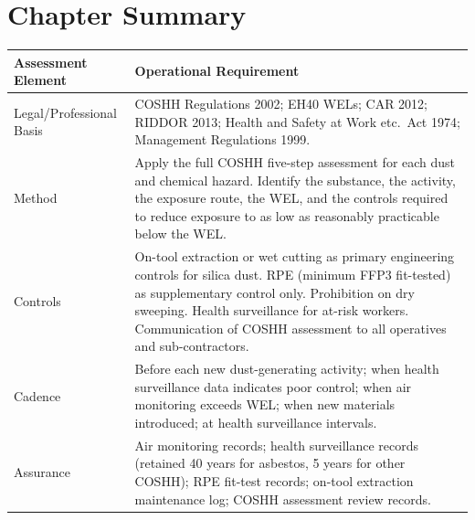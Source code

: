 
\newpage
\section{Chapter Summary}

\begin{table}[H]
\centering
\begin{tabularx}{\textwidth}{>{\raggedright\arraybackslash}p{3.2cm}X}
\toprule
\textbf{Assessment Element} & \textbf{Operational Requirement} \\
\midrule
Legal/Professional Basis & COSHH Regulations 2002; EH40 WELs; CAR 2012; RIDDOR 2013; Health and Safety at Work etc.\ Act 1974; Management Regulations 1999. \\
Method & Apply the full COSHH five-step assessment for each dust and chemical hazard. Identify the substance, the activity, the exposure route, the WEL, and the controls required to reduce exposure to as low as reasonably practicable below the WEL. \\
Controls & On-tool extraction or wet cutting as primary engineering controls for silica dust. RPE (minimum FFP3 fit-tested) as supplementary control only. Prohibition on dry sweeping. Health surveillance for at-risk workers. Communication of COSHH assessment to all operatives and sub-contractors. \\
Cadence & Before each new dust-generating activity; when health surveillance data indicates poor control; when air monitoring exceeds WEL; when new materials introduced; at health surveillance intervals. \\
Assurance & Air monitoring records; health surveillance records (retained 40 years for asbestos, 5 years for other COSHH); RPE fit-test records; on-tool extraction maintenance log; COSHH assessment review records. \\
\bottomrule
\end{tabularx}
\end{table}


